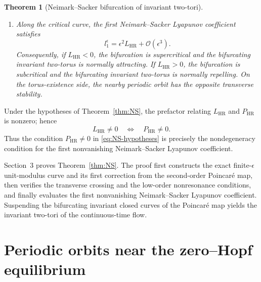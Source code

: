 \documentclass[11pt]{amsart}
\newtheorem{theorem}{Theorem}[section]
\theoremstyle{remark}
\newcommand{\cO}{\mathcal{O}}
\newcommand{\PHR}{P_{\mathrm{HR}}}
\newcommand{\LHR}{L_{\mathrm{HR}}}
\begin{document}
\begin{theorem}[Neimark--Sacker bifurcation of invariant two-tori]
\begin{enumerate}[label=\textup{(\arabic*)},leftmargin=2em]
\item
Along the critical curve, the first Neimark--Sacker Lyapunov coefficient
satisfies
\begin{equation}
\label{eq:l1-main}
 l_1^\epsilon
 =
 \epsilon^2\LHR+\cO(\epsilon^3).
\end{equation}
Consequently, if $\LHR<0$, the bifurcation is supercritical and the
bifurcating invariant two-torus is normally attracting. If $\LHR>0$,
the bifurcation is subcritical and the bifurcating invariant two-torus is
normally repelling. On the torus-existence side, the nearby periodic orbit
has the opposite transverse stability.
\end{enumerate}
\end{theorem}

Under the hypotheses of Theorem~\ref{thm:NS}, the prefactor relating
$\LHR$ and $\PHR$ is nonzero; hence
\[
 \LHR\ne0
 \quad\Longleftrightarrow\quad
 \PHR\ne0.
\]
Thus the condition $\PHR\ne0$ in
\eqref{eq:NS-hypotheses} is precisely the nondegeneracy condition for the
first nonvanishing Neimark--Sacker Lyapunov coefficient.

Section~3 proves Theorem~\ref{thm:NS}. The proof first constructs the
exact finite-$\epsilon$ unit-modulus curve and its first correction from
the second-order Poincar\'e map, then verifies the transverse crossing and
the low-order nonresonance conditions, and finally evaluates the first
nonvanishing Neimark--Sacker Lyapunov coefficient. Suspending the
bifurcating invariant closed curves of the Poincar\'e map yields the
invariant two-tori of the continuous-time flow.

\section{Periodic orbits near the zero--Hopf equilibrium}
\end{document}
